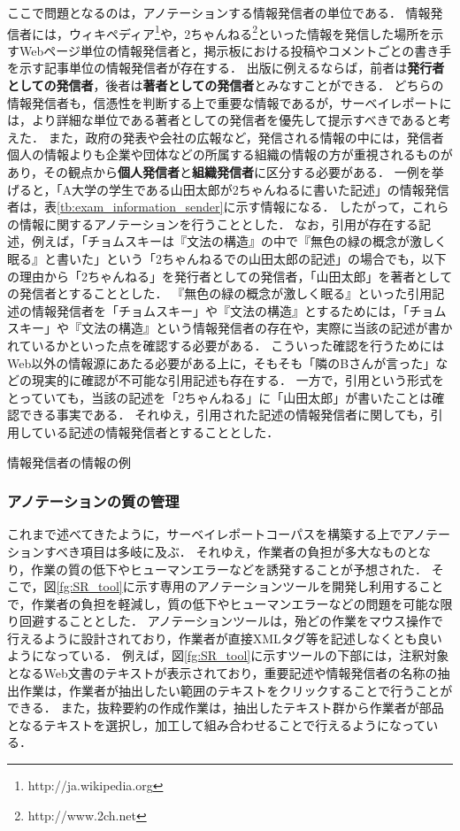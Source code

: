 \documentclass[japanese]{jnlp_1.4}
\begin{document}
ここで問題となるのは，アノテーションする情報発信者の単位である．
情報発信者には，ウィキペディア\footnote{http://ja.wikipedia.org}や，2ちゃんねる\footnote{http://www.2ch.net}といった情報を発信した場所を示すWebページ単位の情報発信者と，掲示板における投稿やコメントごとの書き手を示す記事単位の情報発信者が存在する．
出版に例えるならば，前者は{\bf 発行者としての発信者}，後者は{\bf 著者としての発信者}とみなすことができる．
どちらの情報発信者も，信憑性を判断する上で重要な情報であるが，サーベイレポートには，より詳細な単位である著者としての発信者を優先して提示すべきであると考えた．
また，政府の発表や会社の広報など，発信される情報の中には，発信者個人の情報よりも企業や団体などの所属する組織の情報の方が重視されるものがあり，その観点から{\bf 個人発信者}と{\bf 組織発信者}に区分する必要がある．
一例を挙げると，「A大学の学生である山田太郎が2ちゃんねるに書いた記述」の情報発信者は，表\ref{tb:exam_information_sender}に示す情報になる．
したがって，これらの情報に関するアノテーションを行うこととした．
なお，引用が存在する記述，例えば，「チョムスキーは『文法の構造』の中で『無色の緑の概念が激しく眠る』と書いた」という「2ちゃんねるでの山田太郎の記述」の場合でも，以下の理由から「2ちゃんねる」を発行者としての発信者，「山田太郎」を著者としての発信者とすることとした．
『無色の緑の概念が激しく眠る』といった引用記述の情報発信者を「チョムスキー」や『文法の構造』とするためには，「チョムスキー」や『文法の構造』という情報発信者の存在や，実際に当該の記述が書かれているかといった点を確認する必要がある．
こういった確認を行うためにはWeb以外の情報源にあたる必要がある上に，そもそも「隣のBさんが言った」などの現実的に確認が不可能な引用記述も存在する．
一方で，引用という形式をとっていても，当該の記述を「2ちゃんねる」に「山田太郎」が書いたことは確認できる事実である．
それゆえ，引用された記述の情報発信者に関しても，引用している記述の情報発信者とすることとした．

\begin{table}[t]
 \caption{情報発信者の情報の例}
 \label{tb:exam_information_sender}

\end{table}


\subsubsection{アノテーションの質の管理}

これまで述べてきたように，サーベイレポートコーパスを構築する上でアノテーションすべき項目は多岐に及ぶ．
それゆえ，作業者の負担が多大なものとなり，作業の質の低下やヒューマンエラーなどを誘発することが予想された．
そこで，{図}\ref{fg:SR_tool}に示す専用のアノテーションツールを開発し利用することで，作業者の負担を軽減し，質の低下やヒューマンエラーなどの問題を可能な限り回避することとした．
アノテーションツールは，殆どの作業をマウス操作で行えるように設計されており，作業者が直接XMLタグ等を記述しなくとも良いようになっている．
例えば，図\ref{fg:SR_tool}に示すツールの下部には，注釈対象となるWeb文書のテキストが表示されており，重要記述や情報発信者の名称の抽出作業は，作業者が抽出したい範囲のテキストをクリックすることで行うことができる．
また，抜粋要約の作成作業は，抽出したテキスト群から作業者が部品となるテキストを選択し，加工して組み合わせることで行えるようになっている．
\end{document}
